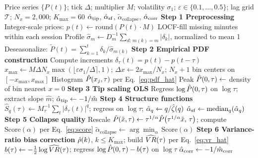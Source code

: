 \documentclass[conference]{IEEEtran}
\begin{document}
\begin{algorithm}[!t]
\small
\caption{L\'{e}vy Scaling Exponent Estimation}
\label{alg:pipeline}
\begin{algorithmic}[1]
\Require Price series $\{P(t)\}$; tick $\Delta$; multiplier $M$; volatility $\sigma_1$;
         $\varepsilon\!\in\!\{0.1,\ldots,0.5\}$; lag grid $\mathcal{T}$; $N_x=2{,}000$; $K_{\max}=60$
\Ensure $\hat{\alpha}_{\mathrm{tip}}$,\; $\hat{\alpha}_{\mathrm{sf}}$,\; $\tilde{\alpha}_{\mathrm{collapse}}$,\; $\hat{\alpha}_{\mathrm{corr}}$
\Statex
\State \textbf{Step 1 Preprocessing}
\State Integer-scale prices:\; $p(t)\leftarrow\mathrm{round}(P(t)\cdot M)$
\State LOCF-fill missing minutes within each session
\State Profile $\hat{\sigma}_m\leftarrow D_m^{-1}\sum_{d:\,m(k)=m}|\delta_k|$, normalized to mean 1
\State Deseasonalize: $\tilde{P}(t)=\textstyle\sum_{k=1}^{t}\delta_k/\hat\sigma_{m(k)}$
\Statex
\State \textbf{Step 2 Empirical PDF construction}
  \State Compute increments $\delta_\tau(t)=p(t)-p(t-\tau)$
  \State $x_{\max}\leftarrow M\Delta N_x\max(\lfloor\varepsilon\sigma_1/\Delta\rceil,1)$;\; $\Delta x\leftarrow 2x_{\max}/N_x$;\; $N_x{+}1$ bin centers on $[-x_{\max},x_{\max}]$
  \State Histogram $\hat{P}(x_j,\tau)$ per Eq.~\eqref{eq:pdf_hat}
  \State Peak $\hat{P}(0,\tau)\leftarrow$ density of bin nearest $x=0$
\EndFor
\Statex
\State \textbf{Step 3 Tip scaling OLS}
\State Regress $\log\hat{P}(0,\tau)$ on $\log\tau$;\; extract slope $\hat{m}$;\; $\hat{\alpha}_{\mathrm{tip}}\leftarrow -1/\hat{m}$
\Statex
\State \textbf{Step 4 Structure functions}
  \State $\hat{S}_q(\tau)\leftarrow M_\tau^{-1}\sum_t|\delta_\tau(t)|^q$;\; regress on $\log\tau$;\; $\hat{\alpha}_q\leftarrow q/\hat\zeta(q)$
\EndFor
\State $\hat{\alpha}_{\mathrm{sf}}\leftarrow\mathrm{median}_q\!\left(\hat{\alpha}_q\right)$
\Statex
\State \textbf{Step 5 Collapse quality}
  \State Rescale $\tilde{P}(\tilde{x},\tau)\leftarrow\tau^{1/\alpha}\hat{P}\!\left(\tau^{1/\alpha}\tilde{x},\,\tau\right)$;\; compute $\mathrm{Score}(\alpha)$ per Eq.~\eqref{eq:score}
\EndFor
\State $\tilde{\alpha}_{\mathrm{collapse}}\leftarrow\arg\min_{\alpha}\,\mathrm{Score}(\alpha)$
\Statex
\State \textbf{Step 6 Variance-ratio bias correction}
\State $\hat{\rho}(k)$, $k\le K_{\max}$;\; build $\widehat{VR}(\tau)$ per Eq.~\eqref{eq:vr_hat}
\State $b(\tau)\leftarrow-\tfrac{1}{2}\log\widehat{VR}(\tau)$;\; regress $\log\hat{P}(0,\tau)-b(\tau)$ on $\log\tau$
\State $\hat{\alpha}_{\mathrm{corr}}\leftarrow-1/\hat{m}_{\mathrm{corr}}$
\end{algorithmic}
\end{algorithm}
\end{document}
